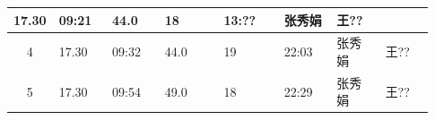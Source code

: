 \documentclass[UTF8,10pt,a4paper,fontset=fandol]{ctexart}
\newcommand{\fieldvalue}[1]{#1}
\newcommand{\handwritten}[1]{#1}
\begin{document}
\begin{center}
\begin{tabular}{|c|p{0.13\linewidth}|p{0.13\linewidth}|p{0.15\linewidth}|p{0.15\linewidth}|p{0.13\linewidth}|p{0.12\linewidth}|p{0.12\linewidth}|}
\fieldvalue{\handwritten{17.30}} &
\fieldvalue{\handwritten{09:21}} &
\fieldvalue{\handwritten{44.0}} &
\fieldvalue{\handwritten{18}} &
\fieldvalue{\handwritten{13:??}} &
\fieldvalue{\handwritten{张秀娟}} &
\fieldvalue{\handwritten{王??}} \\
\hline
4 &
\fieldvalue{\handwritten{17.30}} &
\fieldvalue{\handwritten{09:32}} &
\fieldvalue{\handwritten{44.0}} &
\fieldvalue{\handwritten{19}} &
\fieldvalue{\handwritten{22:03}} &
\fieldvalue{\handwritten{张秀娟}} &
\fieldvalue{\handwritten{王??}} \\
\hline
5 &
\fieldvalue{\handwritten{17.30}} &
\fieldvalue{\handwritten{09:54}} &
\fieldvalue{\handwritten{49.0}} &
\fieldvalue{\handwritten{18}} &
\fieldvalue{\handwritten{22:29}} &
\fieldvalue{\handwritten{张秀娟}} &
\fieldvalue{\handwritten{王??}} \\

\end{tabular}
\end{center}
\end{document}
